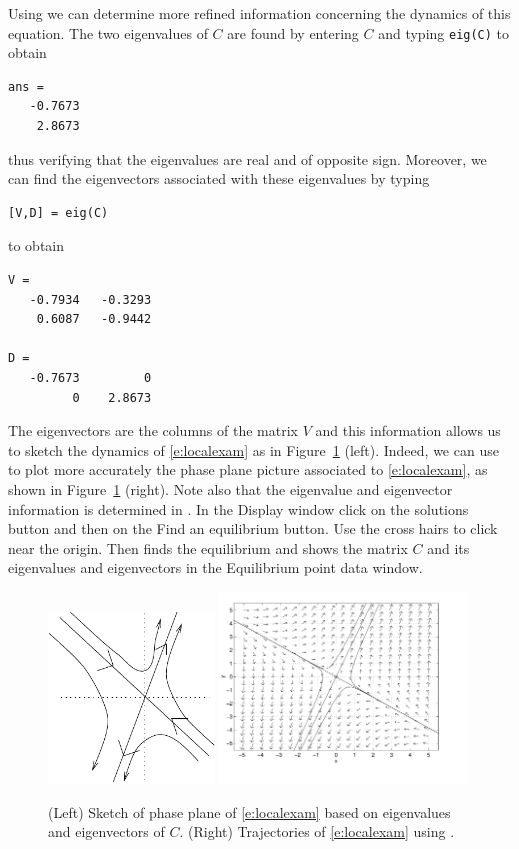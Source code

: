 \documentclass{ximera}
\begin{document}
Using \Matlab we can determine more refined information
concerning the dynamics of this equation.  The two eigenvalues
of $C$ are found by entering $C$ and typing {\tt eig(C)}
to obtain
\begin{verbatim}
ans = 
   -0.7673
    2.8673
\end{verbatim}
thus verifying that the eigenvalues are real and of opposite
sign.  Moreover, we can find the eigenvectors
 associated with these eigenvalues by typing
\begin{verbatim}
[V,D] = eig(C)
\end{verbatim}
to obtain
\begin{verbatim}
V = 
   -0.7934   -0.3293
    0.6087   -0.9442
 
D =
   -0.7673         0
         0    2.8673
\end{verbatim} 
The eigenvectors are the columns of the matrix $V$ and this 
information allows us to sketch the dynamics of
\eqref{e:localexam} as in Figure~\ref{F:local} (left).  Indeed, we
can use {\pplane} to plot more accurately the phase plane
picture associated to \eqref{e:localexam}, as shown in
Figure~\ref{F:local} (right).  Note also that the eigenvalue and eigenvector
information is determined in {\pplane}.  In the {\sf \PPLANE Display}
window click on the {\sf solutions} button and then on the {\sf Find an 
equilibrium} button.  Use the cross hairs to click near the origin.  Then 
{\pplane} finds the equilibrium and shows the matrix $C$ and its eigenvalues
and eigenvectors in the {\sf \PPLANE Equilibrium point data} window.

\begin{figure}[htb]
           \centerline{%
           \includegraphics[height=1.8in]{../figures/locala.pdf}
           \includegraphics[height=2.0in]{../figures/localb.pdf}}
           \caption{(Left) Sketch of phase plane of \protect\eqref{e:localexam} 
	based on eigenvalues and eigenvectors of $C$. (Right) Trajectories 
	of \protect\eqref{e:localexam} using {\pplane}.}
           \label{F:local}
\end{figure}
\end{document}
